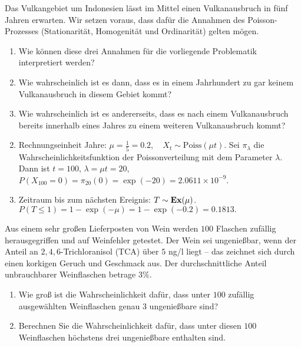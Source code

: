  Das Vulkangebiet um Indonesien l\"asst im Mittel einen Vulkanausbruch
in f\"unf Jahren erwarten. Wir setzen voraus, dass dafür die Annahmen des
Poisson-Prozesses (Stationarität, Homogenität und Ordinarität) gelten mögen.
\begin{enumerate}
    \item Wie können diese drei Annahmen für die vorliegende Problematik interpretiert werden?

    \item Wie wahrscheinlich ist es dann, dass es in einem Jahrhundert zu gar keinem Vulkanausbruch in diesem
    Gebiet kommt?
    \item Wie wahrscheinlich ist es andererseits, dass es nach einem Vulkanausbruch bereits innerhalb eines Jahres zu einem
    weiteren Vulkanausbruch kommt?
\end{enumerate}

\solution
\begin{enumerate}
        \setcounter{enumi}{1}
    \item Rechnungseinheit Jahre: $\mu=\frac{1}{5}=0.2, \quad X_t \sim \text{Poiss}(\mu t).$
        Sei $\pi_{\lambda}$ die Wahrscheinlichkeitsfunktion der Poissonverteilung mit dem Parameter $\lambda$. Dann ist
        $t=100$, $\lambda=\mu t=20$, $P(X_{100}=0)=\pi_{20}(0)= \exp(-20)=2.0611 \times 10^{-9}$.
    \item Zeitraum bis zum nächsten Ereignis: $T \sim \mathbf{Ex}(\mu)$.
        $P(T \le 1)=1-\exp(-\mu)=1-\exp(-0.2)=0.1813.$
\end{enumerate}

 Aus einem sehr großen Lieferposten
von Wein werden $100$ Flaschen zufällig herausgegriffen und auf Weinfehler
getestet.  Der Wein sei ungenießbar, wenn der Anteil an $2,4,6$-Trichloranisol
(TCA) über $5$ ng/l liegt -- das zeichnet sich durch einen korkigen Geruch und
Geschmack aus.  Der durchschnittliche Anteil unbrauchbarer Weinflaschen betrage
$3\%$. 
\begin{enumerate}
    \item Wie groß ist die Wahrscheinlichkeit dafür, dass unter $100$ zufällig 
        ausgewählten Weinflaschen genau $3$ ungenießbare sind? 
    \item Berechnen Sie die Wahrscheinlichkeit dafür, dass unter diesen $100$
        Weinflaschen höchstens drei ungenießbare enthalten sind. 
\end{enumerate}

